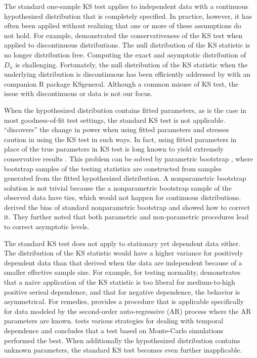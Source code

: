 \documentclass[12pt, letterpaper, titlepage]{article}
\begin{document}
The standard one-sample KS test applies to independent data with a continuous
hypothesized distribution that is completely specified. In practice, however, it
has often been applied without realizing that one or more of these assumptions
do not hold. For example, \citet{Noether} demonstrated the conservativeness of
the KS test when applied to discontinuous distributions. The null distribution
of the KS statistic is no longer distribution free. Computing the
exact and asymptotic distribution of $D_n$ is challenging. Fortunately, the null
distribution of the KS statistic when the underlying distribution is
discontinuous has been efficiently addressed by \citet{Dimitrova} with an
companion R package \textsf{KSgeneral}. Although a common misuse of KS test, the
issue with discontinuous or data is not our focus.


When the hypothesized distribution contains fitted parameters, as is the case in
most goodness-of-fit test settings, the standard KS test is not applicable.
\citet{Steinskog} ``discovers'' the change in power
when using fitted parameters and stresses caution in using the KS test in
such ways. In fact, using fitted parameters in place of the true parameters in
KS test is long known to yield extremely conservative results
\citep[e.g.,][]{Lilliefors}. This problem can be solved by parametric
bootstrap \citep{efron1985bootstrap, hall1991two}, where
bootstrap samples of the testing statistics are constructed from samples
generated from the fitted hypothesized distribution. A nonparametric bootstrap
solution is not trivial because the a nonparametric bootstrap sample of the
observed data have ties, which would not happen for continuous distributions.
\citet{Babu} derived the bias of standard nonparametric bootstrap and
showed how to correct it. They further noted that both parametric and
non-parametric procedures lead to correct asymptotic levels.


The standard KS test does not apply to stationary yet dependent data either. The
distribution of the KS statistic would have a higher variance for positively
dependent data than that derived when the data are independent because of a
smaller effective sample size. For example, for
testing normality, \citet{Durilleul} demonstrates that a naive application of
the KS statistic is too liberal for medium-to-high positive serieal dependence,
and that for negative dependence, the behavior is asymmetrical. For remedies,
\citet{Weiss} provides a procedure that is applicable specifically for data
modeled by the second-order auto-regressive (AR) process where the AR parameters
are known. \citet{Lanzante} tests various strategies for dealing with temporal
dependence and concludes that a test based on Monte-Carlo simulations performed
the best. When additionally the hypothesized distribution contains unknown
parameters, the standard KS test becomes even further inapplicable.
\end{document}
